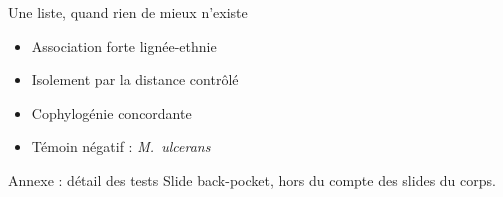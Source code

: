 \documentclass[aspectratio=169,11pt]{beamer}
\begin{document}
\begin{frame}{Une liste, quand rien de mieux n'existe}
\begin{itemize}
  \item Association forte lign\'ee-ethnie
  \item Isolement par la distance contr\^ol\'e
  \item Cophylog\'enie concordante
  \item T\'emoin n\'egatif : \textit{M.~ulcerans}
\end{itemize}
\end{frame}

\appendix
\begin{frame}{Annexe : d\'etail des tests}
Slide back-pocket, hors du compte des slides du corps.
\end{frame}
\end{document}
